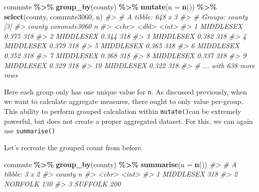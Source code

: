 \documentclass[
]{book}
\newenvironment{Shaded}{\begin{snugshade}}{\end{snugshade}}
\newcommand{\CommentTok}[1]{\textcolor[rgb]{0.56,0.35,0.01}{\textit{#1}}}
\newcommand{\DataTypeTok}[1]{\textcolor[rgb]{0.13,0.29,0.53}{#1}}
\newcommand{\KeywordTok}[1]{\textcolor[rgb]{0.13,0.29,0.53}{\textbf{#1}}}
\newcommand{\NormalTok}[1]{#1}
\newcommand{\OperatorTok}[1]{\textcolor[rgb]{0.81,0.36,0.00}{\textbf{#1}}}
\newcommand{\StringTok}[1]{\textcolor[rgb]{0.31,0.60,0.02}{#1}}
\begin{document}
\begin{Shaded}
\begin{Highlighting}[]
\NormalTok{commute }\OperatorTok{\%\textgreater{}\%}\StringTok{ }
\StringTok{  }\KeywordTok{group\_by}\NormalTok{(county) }\OperatorTok{\%\textgreater{}\%}\StringTok{ }
\StringTok{  }\KeywordTok{mutate}\NormalTok{(}\DataTypeTok{n =} \KeywordTok{n}\NormalTok{()) }\OperatorTok{\%\textgreater{}\%}\StringTok{ }
\StringTok{  }\KeywordTok{select}\NormalTok{(county, commute3060, n) }
\CommentTok{\#\textgreater{} \# A tibble: 648 x 3}
\CommentTok{\#\textgreater{} \# Groups:   county [3]}
\CommentTok{\#\textgreater{}    county    commute3060     n}
\CommentTok{\#\textgreater{}    \textless{}chr\textgreater{}           \textless{}dbl\textgreater{} \textless{}int\textgreater{}}
\CommentTok{\#\textgreater{}  1 MIDDLESEX       0.375   318}
\CommentTok{\#\textgreater{}  2 MIDDLESEX       0.344   318}
\CommentTok{\#\textgreater{}  3 MIDDLESEX       0.382   318}
\CommentTok{\#\textgreater{}  4 MIDDLESEX       0.379   318}
\CommentTok{\#\textgreater{}  5 MIDDLESEX       0.365   318}
\CommentTok{\#\textgreater{}  6 MIDDLESEX       0.352   318}
\CommentTok{\#\textgreater{}  7 MIDDLESEX       0.368   318}
\CommentTok{\#\textgreater{}  8 MIDDLESEX       0.337   318}
\CommentTok{\#\textgreater{}  9 MIDDLESEX       0.329   318}
\CommentTok{\#\textgreater{} 10 MIDDLESEX       0.322   318}
\CommentTok{\#\textgreater{} \# ... with 638 more rows}
\end{Highlighting}
\end{Shaded}

Here each group only has one unique value for \texttt{n}. As discussed previously, when we want to calculate aggregate measures, there ought to only value per-group. This ability to perform grouped calculation within \texttt{mutate()}can be extremely powerful, but does not create a proper aggregated dataset. For this, we can again use \texttt{summarise()}

Let's recreate the grouped count from before.

\begin{Shaded}
\begin{Highlighting}[]
\NormalTok{commute }\OperatorTok{\%\textgreater{}\%}\StringTok{ }
\StringTok{  }\KeywordTok{group\_by}\NormalTok{(county) }\OperatorTok{\%\textgreater{}\%}\StringTok{ }
\StringTok{  }\KeywordTok{summarise}\NormalTok{(}\DataTypeTok{n =} \KeywordTok{n}\NormalTok{())}
\CommentTok{\#\textgreater{} \# A tibble: 3 x 2}
\CommentTok{\#\textgreater{}   county        n}
\CommentTok{\#\textgreater{}   \textless{}chr\textgreater{}     \textless{}int\textgreater{}}
\CommentTok{\#\textgreater{} 1 MIDDLESEX   318}
\CommentTok{\#\textgreater{} 2 NORFOLK     130}
\CommentTok{\#\textgreater{} 3 SUFFOLK     200}
\end{Highlighting}
\end{Shaded}
\end{document}

